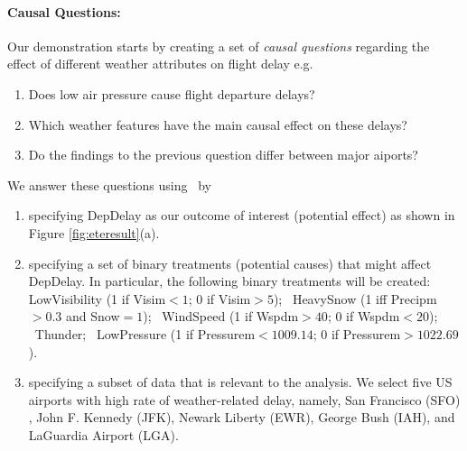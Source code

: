   \paragraph{\bf Causal Questions:}
Our demonstration starts by creating a set of {\em causal questions} regarding the effect of different weather attributes on flight delay e.g.
\begin{enumerate}
  \item Does low air pressure cause flight departure delays?
  \item Which weather features have the main causal effect on these delays?
  \item Do the findings to the previous question differ between major aiports?
\end{enumerate}
We answer these questions using \GSQL\ by
    \begin{enumerate}
      \item specifying DepDelay as our outcome of interest (potential effect) as shown in Figure \ref{fig:eteresult}(a).
      \item specifying a set of binary treatments (potential causes) that might affect DepDelay. In particular, the following binary treatments will be created: LowVisibility (1 if Visim$<1$; 0 if Visim$>5$); \ HeavySnow (1 iff Precipm$>0.3$ and Snow$=1$); \ WindSpeed (1 if Wspdm$>40$; 0 if Wspdm$<20$); \  Thunder; \ LowPressure (1 if Pressurem$<1009.14$; 0 if Pressurem$>1022.69$).

      \item specifying a subset of data that is relevant to the analysis.  We select five US airports  with high rate of weather-related delay, namely, San Francisco (SFO) , John F. Kennedy (JFK), Newark Liberty (EWR), George Bush (IAH), and LaGuardia Airport (LGA).
\end{enumerate}


